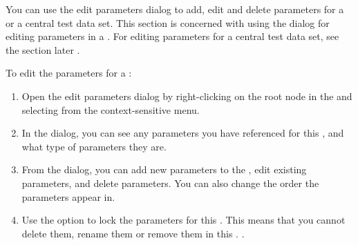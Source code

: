 
You can use the edit parameters dialog to add, edit and delete parameters for a \gdcase{} or a central test data set. This section is concerned with using the dialog for editing parameters in a \gdcase{}. For editing parameters for a central test data set, see the section later . 

To edit the parameters for a \gdcase{}:
\begin{enumerate}
\item Open the edit parameters dialog by right-clicking on the root node in the \gdtestcaseeditor{} and selecting  from the context-sensitive menu. 
\item In the dialog, you can see any parameters you have referenced for this \gdcase{}, and what type of parameters they are. 
\item From the dialog, you can add new parameters to the \gdcase{}, edit existing parameters, and delete parameters. 
You can also change the order the parameters appear in.
\item Use the  option to lock the parameters for this \gdcase{}. This means that you cannot delete them, rename them or remove them in this \gdcase{}. 
.
\end{enumerate}

